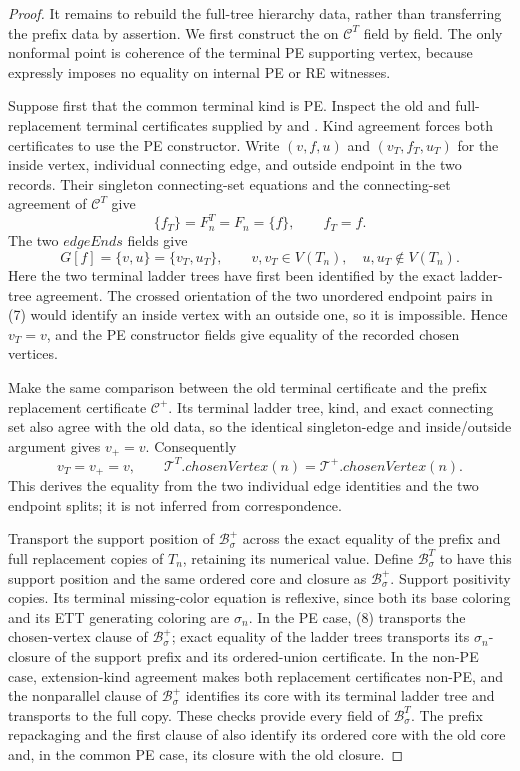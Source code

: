 \begin{proof}
It remains to rebuild the full-tree hierarchy data, rather than transferring
the prefix data by assertion.  We first construct the
 on \(\mathcal C^T\) field by field.  The only
nonformal point is coherence of the terminal PE supporting vertex, because
 expressly imposes no equality
on internal PE or RE witnesses.

Suppose first that the common terminal kind is PE.  Inspect the old and
full-replacement terminal certificates supplied by
 and .  Kind
agreement forces both certificates to use the PE constructor.  Write
\((v,f,u)\) and \((v_T,f_T,u_T)\) for the inside vertex, individual
connecting edge, and outside endpoint in the two
 records.  Their singleton connecting-set
equations and the connecting-set agreement of \(\mathcal C^T\) give
\[
              \{f_T\}=F_n^T=F_n=\{f\},\qquad f_T=f.          \tag{6}
\]
The two \(\mathit{edgeEnds}\) fields give
\[
 G[f]=\{v,u\}=\{v_T,u_T\},\qquad
 v,v_T\in V(T_n),\quad u,u_T\notin V(T_n).                  \tag{7}
\]
Here the two terminal ladder trees have first been identified by the exact
ladder-tree agreement.  The crossed orientation of the two unordered
endpoint pairs in (7) would identify an inside vertex with an outside one,
so it is impossible.  Hence \(v_T=v\), and the PE constructor fields give
equality of the recorded chosen vertices.

Make the same comparison between the old terminal certificate and the
prefix replacement certificate \(\mathcal C^+\).  Its terminal ladder
tree, kind, and exact connecting set also agree with the old data, so the
identical singleton-edge and inside/outside argument gives \(v_+=v\).
Consequently
\[
 v_T=v_+=v,\qquad
 \mathcal T^T.\mathit{chosenVertex}(n)
   =\mathcal T^+.\mathit{chosenVertex}(n).                   \tag{8}
\]
This derives the equality from the two individual edge identities and the
two endpoint splits; it is not inferred from correspondence.

Transport the support position of \(\mathcal B^+_\sigma\) across the exact
equality of the prefix and full replacement copies of \(T_n\), retaining
its numerical value.  Define \(\mathcal B^T_\sigma\) to have this support
position and the same ordered core and closure as
\(\mathcal B^+_\sigma\).  Support positivity copies.  Its terminal
missing-color equation is reflexive, since both its base coloring and its
ETT generating coloring are \(\sigma_n\).  In the PE case, (8) transports
the chosen-vertex clause of \(\mathcal B^+_\sigma\); exact equality of the
ladder trees transports its \(\sigma_n\)-closure of the support prefix and
its ordered-union certificate.  In the non-PE case, extension-kind
agreement makes both replacement certificates non-PE, and the
nonparallel clause of \(\mathcal B^+_\sigma\) identifies its core with its
terminal ladder tree and transports to the full copy.  These checks provide
every field of \(\mathcal B^T_\sigma\).  The prefix repackaging and the
first clause of  also identify its ordered core
with the old core and, in the common PE case, its closure with the old
closure.


\end{proof}
